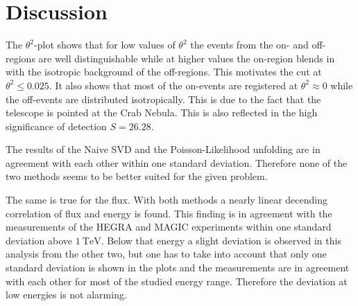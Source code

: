 \section{Discussion}
\label{sec:Diskussion}

The $\theta^2$-plot shows that for low values of $\theta^2$ the events from the on- and off-regions are well distinguishable while at higher values the on-region blends in with the isotropic background of the off-regions. This motivates the cut at $\theta^2 \leq \num{0.025}$. It also shows that most of the on-events are registered at $\theta^2 \approx 0$ while the off-events are distributed isotropically. This is due to the fact that the telescope is pointed at the Crab Nebula. This is also reflected in the high significance of detection $S = \num{26.28}$.

The results of the Naive SVD and the Poisson-Likelihood unfolding are in agreement with each other within one standard deviation. Therefore none of the two methods seems to be better suited for the given problem.

The same is true for the flux. With both methods a nearly linear decending correlation of flux and energy is found. This finding is in agreement with the measurements of the HEGRA and MAGIC experiments within one standard deviation above $\SI{1}{\tera\eV}$. Below that energy a slight deviation is observed in this analysis from the other two, but one has to take into account that only one standard deviation is shown in the plots and the measurements are in agreement with each other for most of the studied energy range. Therefore the deviation at low energies is not alarming.
